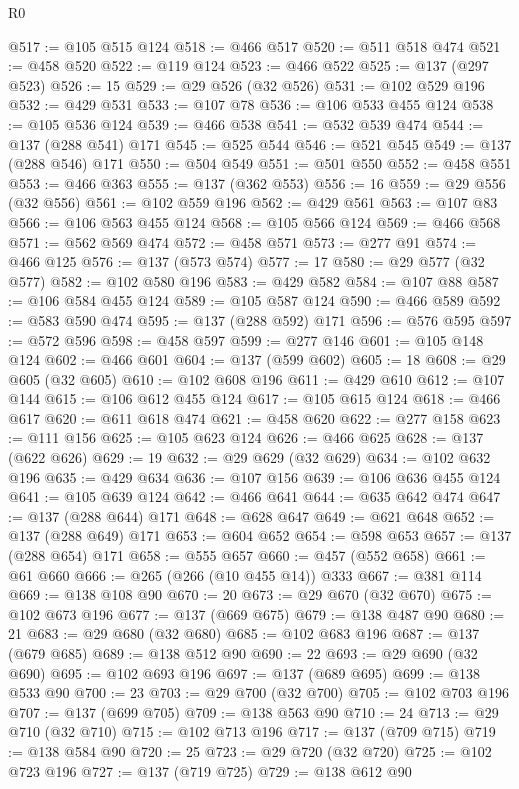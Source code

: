 \begin{lexlean}{R0}
\begin{coremodule}
{{{{{{{{{{{{{{{{{{{{{{{{{{{{{{{{{{{{{{{{{{{{{{{{{{{{{{{{{{{{{{{{{{{{{{{{{{{{{{{{{{{{{{@517 := @105 @515 @124
@518 := @466 @517
@520 := @511 @518 @474
@521 := @458 @520
@522 := @119 @124
@523 := @466 @522
@525 := @137 (@297 @523)
@526 := 15
@529 := @29 @526 (@32 @526)
@531 := @102 @529 @196
@532 := @429 @531
@533 := @107 @78
@536 := @106 @533 @455 @124
@538 := @105 @536 @124
@539 := @466 @538
@541 := @532 @539 @474
@544 := @137 (@288 @541) @171
@545 := @525 @544
@546 := @521 @545
@549 := @137 (@288 @546) @171
@550 := @504 @549
@551 := @501 @550
@552 := @458 @551
@553 := @466 @363
@555 := @137 (@362 @553)
@556 := 16
@559 := @29 @556 (@32 @556)
@561 := @102 @559 @196
@562 := @429 @561
@563 := @107 @83
@566 := @106 @563 @455 @124
@568 := @105 @566 @124
@569 := @466 @568
@571 := @562 @569 @474
@572 := @458 @571
@573 := @277 @91
@574 := @466 @125
@576 := @137 (@573 @574)
@577 := 17
@580 := @29 @577 (@32 @577)
@582 := @102 @580 @196
@583 := @429 @582
@584 := @107 @88
@587 := @106 @584 @455 @124
@589 := @105 @587 @124
@590 := @466 @589
@592 := @583 @590 @474
@595 := @137 (@288 @592) @171
@596 := @576 @595
@597 := @572 @596
@598 := @458 @597
@599 := @277 @146
@601 := @105 @148 @124
@602 := @466 @601
@604 := @137 (@599 @602)
@605 := 18
@608 := @29 @605 (@32 @605)
@610 := @102 @608 @196
@611 := @429 @610
@612 := @107 @144
@615 := @106 @612 @455 @124
@617 := @105 @615 @124
@618 := @466 @617
@620 := @611 @618 @474
@621 := @458 @620
@622 := @277 @158
@623 := @111 @156
@625 := @105 @623 @124
@626 := @466 @625
@628 := @137 (@622 @626)
@629 := 19
@632 := @29 @629 (@32 @629)
@634 := @102 @632 @196
@635 := @429 @634
@636 := @107 @156
@639 := @106 @636 @455 @124
@641 := @105 @639 @124
@642 := @466 @641
@644 := @635 @642 @474
@647 := @137 (@288 @644) @171
@648 := @628 @647
@649 := @621 @648
@652 := @137 (@288 @649) @171
@653 := @604 @652
@654 := @598 @653
@657 := @137 (@288 @654) @171
@658 := @555 @657
@660 := @457 (@552 @658)
@661 := @61 @660
@666 := @265 (@266 (@10 @455 @14)) @333
@667 := @381 @114
@669 := @138 @108 @90
@670 := 20
@673 := @29 @670 (@32 @670)
@675 := @102 @673 @196
@677 := @137 (@669 @675)
@679 := @138 @487 @90
@680 := 21
@683 := @29 @680 (@32 @680)
@685 := @102 @683 @196
@687 := @137 (@679 @685)
@689 := @138 @512 @90
@690 := 22
@693 := @29 @690 (@32 @690)
@695 := @102 @693 @196
@697 := @137 (@689 @695)
@699 := @138 @533 @90
@700 := 23
@703 := @29 @700 (@32 @700)
@705 := @102 @703 @196
@707 := @137 (@699 @705)
@709 := @138 @563 @90
@710 := 24
@713 := @29 @710 (@32 @710)
@715 := @102 @713 @196
@717 := @137 (@709 @715)
@719 := @138 @584 @90
@720 := 25
@723 := @29 @720 (@32 @720)
@725 := @102 @723 @196
@727 := @137 (@719 @725)
@729 := @138 @612 @90
}}}}}}}}}}}}}}}}}}}}}}}}}}}}}}}}}}}}}}}}}}}}}}}}}}}}}}}}}}}}}}}}}}}}}}}}}}}}}}}}}}}}}}
\end{coremodule}
\end{lexlean}
